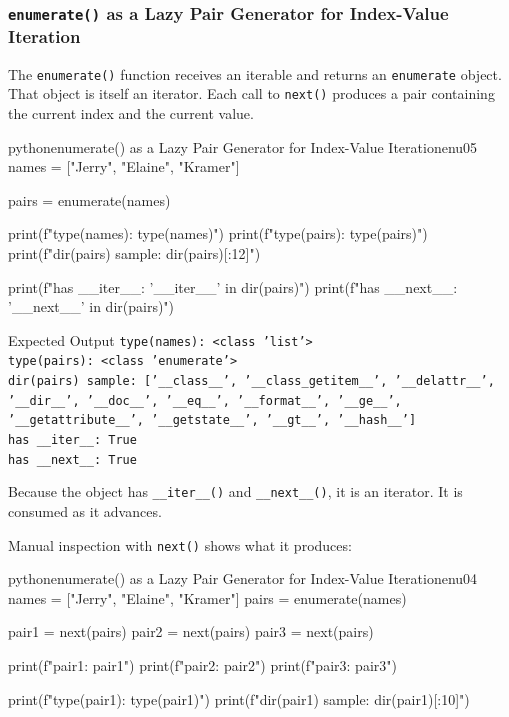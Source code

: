 \documentclass[a4paper,twoside]{report}
\begin{document}
\subsubsection{\texttt{enumerate()} as a Lazy Pair Generator for Index-Value Iteration}

The \texttt{enumerate()} function receives an iterable and returns an \texttt{enumerate} object. That object is itself an iterator. Each call to \texttt{next()} produces a pair containing the current index and the current value.

\begin{codebox}[]{python}{enumerate() as a Lazy Pair Generator for Index-Value Iteration}{enu05}
names = ["Jerry", "Elaine", "Kramer"]

pairs = enumerate(names)

print(f"type(names): {type(names)}")
print(f"type(pairs): {type(pairs)}")
print(f"dir(pairs) sample: {dir(pairs)[:12]}")

print(f"has __iter__: {'__iter__' in dir(pairs)}")
print(f"has __next__: {'__next__' in dir(pairs)}")
\end{codebox}


\begin{iobox}{Expected Output}
\texttt{type(names): <class 'list'>} \\
\texttt{type(pairs): <class 'enumerate'>} \\
\texttt{dir(pairs) sample: ['\_\_class\_\_', '\_\_class\_getitem\_\_', '\_\_delattr\_\_',} \\
\texttt{'\_\_dir\_\_', '\_\_doc\_\_', '\_\_eq\_\_', '\_\_format\_\_', '\_\_ge\_\_',} \\
\texttt{'\_\_getattribute\_\_', '\_\_getstate\_\_', '\_\_gt\_\_', '\_\_hash\_\_']} \\
\texttt{has \_\_iter\_\_: True} \\
\texttt{has \_\_next\_\_: True} \\
\end{iobox}


Because the object has \texttt{\_\_iter\_\_()} and \texttt{\_\_next\_\_()}, it is an iterator. It is consumed as it advances.

Manual inspection with \texttt{next()} shows what it produces:

\begin{codebox}[]{python}{enumerate() as a Lazy Pair Generator for Index-Value Iteration}{enu04}
names = ["Jerry", "Elaine", "Kramer"]
pairs = enumerate(names)

pair1 = next(pairs)
pair2 = next(pairs)
pair3 = next(pairs)

print(f"pair1: {pair1}")
print(f"pair2: {pair2}")
print(f"pair3: {pair3}")

print(f"type(pair1): {type(pair1)}")
print(f"dir(pair1) sample: {dir(pair1)[:10]}")
\end{codebox}
\end{document}
